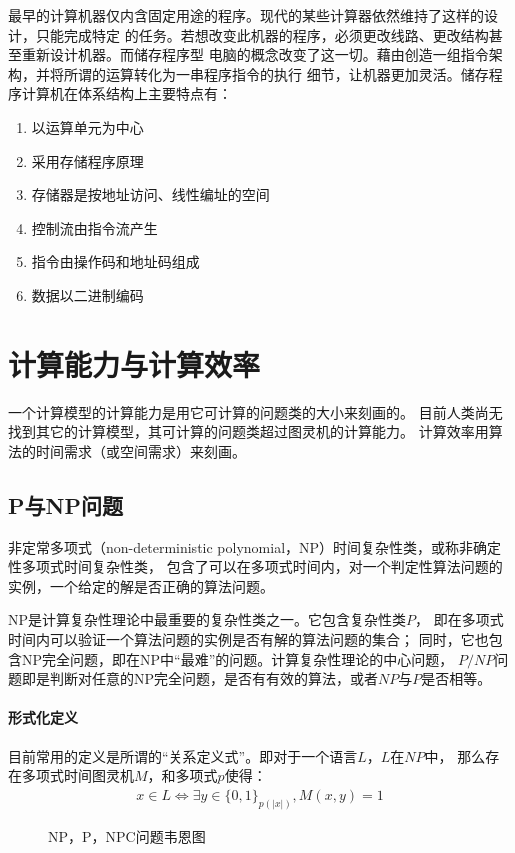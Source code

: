 最早的计算机器仅内含固定用途的程序。现代的某些计算器依然维持了这样的设计，只能完成特定
的任务。若想改变此机器的程序，必须更改线路、更改结构甚至重新设计机器。而储存程序型
电脑的概念改变了这一切。藉由创造一组指令架构，并将所谓的运算转化为一串程序指令的执行
细节，让机器更加灵活。储存程序计算机在体系结构上主要特点有：
\begin{enumerate}
  \item 以运算单元为中心
  \item 采用存储程序原理
  \item 存储器是按地址访问、线性编址的空间
  \item 控制流由指令流产生
  \item 指令由操作码和地址码组成
  \item 数据以二进制编码
\end{enumerate}

\section{计算能力与计算效率}
一个计算模型的计算能力是用它可计算的问题类的大小来刻画的。
目前人类尚无找到其它的计算模型，其可计算的问题类超过图灵机的计算能力。
计算效率用算法的时间需求（或空间需求）来刻画。

\subsection{P与NP问题}
非定常多项式（non-deterministic polynomial，NP）时间复杂性类，或称非确定性多项式时间复杂性类，
包含了可以在多项式时间内，对一个判定性算法问题的实例，一个给定的解是否正确的算法问题。

NP是计算复杂性理论中最重要的复杂性类之一。它包含复杂性类$P$，
即在多项式时间内可以验证一个算法问题的实例是否有解的算法问题的集合；
同时，它也包含NP完全问题，即在NP中“最难”的问题。计算复杂性理论的中心问题，
$ P/NP $问题即是判断对任意的NP完全问题，是否有有效的算法，或者$NP$与$P$是否相等。

\paragraph{形式化定义}
目前常用的定义是所谓的“关系定义式”。即对于一个语言$L$，$L$在$NP$中，
那么存在多项式时间图灵机$M$，和多项式$p$使得\cite{DBLP:journals/jacm/Ladner75}：
\begin{align*}
  x \in L \iff \exists y \in \{0,1\}_{p(|x|)}, M(x,y) = 1
\end{align*}

\begin{figure}[H]
  \caption{NP，P，NPC问题韦恩图}
  \centering
  
\end{figure}

